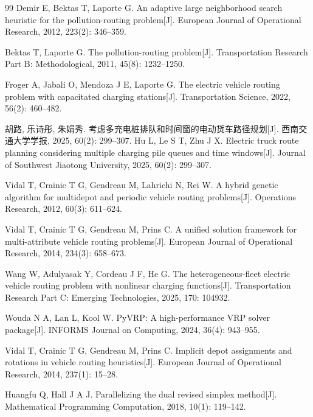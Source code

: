 \documentclass{setp-new}
\begin{document}
\begin{thebibliography}{99}
 Demir E, Bektas T, Laporte G. An adaptive large neighborhood search heuristic for the pollution-routing problem[J]. European Journal of Operational Research, 2012, 223(2): 346--359.

 Bektas T, Laporte G. The pollution-routing problem[J]. Transportation Research Part B: Methodological, 2011, 45(8): 1232--1250.

 Froger A, Jabali O, Mendoza J E, Laporte G. The electric vehicle routing problem with capacitated charging stations[J]. Transportation Science, 2022, 56(2): 460--482.

 胡路, 乐诗彤, 朱娟秀. 考虑多充电桩排队和时间窗的电动货车路径规划[J]. 西南交通大学学报, 2025, 60(2): 299--307.\newline
Hu L, Le S T, Zhu J X. Electric truck route planning considering multiple charging pile queues and time windows[J]. Journal of Southwest Jiaotong University, 2025, 60(2): 299--307.

 Vidal T, Crainic T G, Gendreau M, Lahrichi N, Rei W. A hybrid genetic algorithm for multidepot and periodic vehicle routing problems[J]. Operations Research, 2012, 60(3): 611--624.

 Vidal T, Crainic T G, Gendreau M, Prins C. A unified solution framework for multi-attribute vehicle routing problems[J]. European Journal of Operational Research, 2014, 234(3): 658--673.


 Wang W, Adulyasak Y, Cordeau J F, He G. The heterogeneous-fleet electric vehicle routing problem with nonlinear charging functions[J]. Transportation Research Part C: Emerging Technologies, 2025, 170: 104932.

 Wouda N A, Lan L, Kool W. PyVRP: A high-performance VRP solver package[J]. INFORMS Journal on Computing, 2024, 36(4): 943--955.

 Vidal T, Crainic T G, Gendreau M, Prins C. Implicit depot assignments and rotations in vehicle routing heuristics[J]. European Journal of Operational Research, 2014, 237(1): 15--28.

 Huangfu Q, Hall J A J. Parallelizing the dual revised simplex method[J]. Mathematical Programming Computation, 2018, 10(1): 119--142.


\end{thebibliography}
\end{document}
